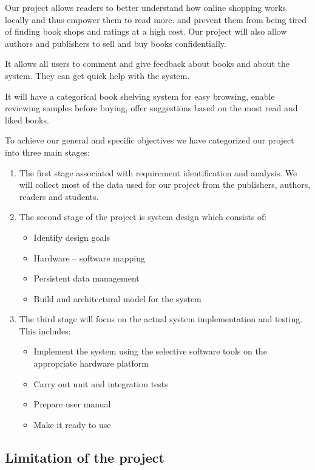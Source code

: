 Our project allows readers to better understand how online shopping works locally and thus empower them to read more. and prevent them from being tired of finding book shops and ratings at a high cost. Our project will also allow authors and publishers to sell and buy books confidentially.

It allows all users to comment and give feedback about books and about the system. They can get quick help with the system. 

It will have a categorical book shelving system for easy browsing, enable reviewing samples before buying, offer suggestions based on the most read and liked books.

To achieve our general and specific objectives we have categorized our project into three main stages:

\begin{enumerate}
	\item The first stage associated with requirement identification and analysis. We will collect most of the data used for our project from the publishers, authors, readers and students.
	
	\item The second stage of the project is system design which consists of:	
	\begin{itemize}
		\item Identify design goals
		\item Hardware – software mapping
		\item Persistent data management
		\item Build and architectural model for the system
	\end{itemize}

	\item The third stage will focus on the actual system implementation and testing. This includes:
	\begin{itemize}
		\item Implement the system using the selective software tools on the appropriate hardware platform
		\item Carry out unit and integration tests
		\item Prepare user manual
		\item Make it ready to use
	\end{itemize}
\end{enumerate}

	\subsection{Limitation of the project}

